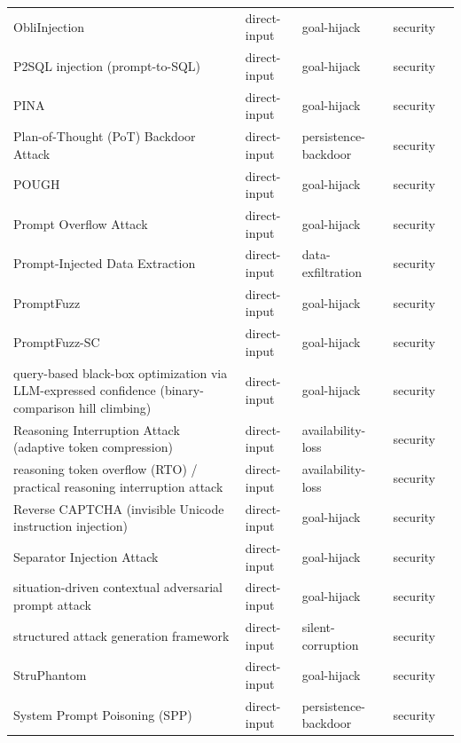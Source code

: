 \begin{longtable}{@{}p{}llll@{}}
ObliInjection & direct-input & goal-hijack & security & \cite{wang-2025-obliinjection} \\
P2SQL injection (prompt-to-SQL) & direct-input & goal-hijack & security & \cite{pedro-2023-prompt} \\
PINA & direct-input & goal-hijack & security & \cite{liu-2026-pina} \\
Plan-of-Thought (PoT) Backdoor Attack & direct-input & persistence-backdoor & security & \cite{zhang-2024-agent} \\
POUGH & direct-input & goal-hijack & security & \cite{huang-2024-efficient} \\
Prompt Overflow Attack & direct-input & goal-hijack & security & \cite{zhou-2026-prompt} \\
Prompt-Injected Data Extraction & direct-input & data-exfiltration & security & \cite{qi-2024-follow} \\
PromptFuzz & direct-input & goal-hijack & security & \cite{yu-2024-promptfuzz} \\
PromptFuzz-SC & direct-input & goal-hijack & security & \cite{ren-2026-deepseek} \\
query-based black-box optimization via LLM-expressed confidence (binary-comparison hill climbing) & direct-input & goal-hijack & security & \cite{zhang-2025-blackbox} \\
Reasoning Interruption Attack (adaptive token compression) & direct-input & availability-loss & security & \cite{cui-2025-tokenefficient} \\
reasoning token overflow (RTO) / practical reasoning interruption attack & direct-input & availability-loss & security & \cite{cui-2025-practical} \\
Reverse CAPTCHA (invisible Unicode instruction injection) & direct-input & goal-hijack & security & \cite{graves-2026-reverse} \\
Separator Injection Attack & direct-input & goal-hijack & security & \cite{li-2025-separator} \\
situation-driven contextual adversarial prompt attack & direct-input & goal-hijack & security & \cite{das-2024-humaninterpretable} \\
structured attack generation framework & direct-input & silent-corruption & security & \cite{cai-2026-prompt} \\
StruPhantom & direct-input & goal-hijack & security & \cite{feng-2025-struphantom} \\
System Prompt Poisoning (SPP) & direct-input & persistence-backdoor & security & \cite{guo-2025-system} \\

\end{longtable}
